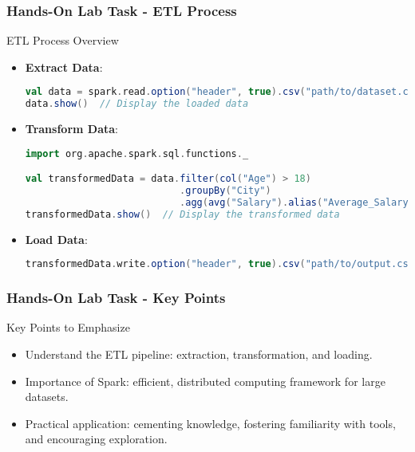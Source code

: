 \documentclass[aspectratio=169]{beamer}
\begin{document}
\begin{frame}[fragile]
    \frametitle{Hands-On Lab Task - ETL Process}
    \begin{block}{ETL Process Overview}
        \begin{itemize}
            \item \textbf{Extract Data}:
                \begin{lstlisting}[language=scala]
val data = spark.read.option("header", true).csv("path/to/dataset.csv")
data.show()  // Display the loaded data
                \end{lstlisting}
            
            \item \textbf{Transform Data}:
                \begin{lstlisting}[language=scala]
import org.apache.spark.sql.functions._

val transformedData = data.filter(col("Age") > 18)
                           .groupBy("City")
                           .agg(avg("Salary").alias("Average_Salary"))
transformedData.show()  // Display the transformed data
                \end{lstlisting}
                
            \item \textbf{Load Data}:
                \begin{lstlisting}[language=scala]
transformedData.write.option("header", true).csv("path/to/output.csv")
                \end{lstlisting}
        \end{itemize}
    \end{block}
\end{frame}

\begin{frame}[fragile]
    \frametitle{Hands-On Lab Task - Key Points}
    \begin{block}{Key Points to Emphasize}
        \begin{itemize}
            \item Understand the ETL pipeline: extraction, transformation, and loading.
            \item Importance of Spark: efficient, distributed computing framework for large datasets.
            \item Practical application: cementing knowledge, fostering familiarity with tools, and encouraging exploration.
        \end{itemize}
    \end{block}
\end{frame}
\end{document}
